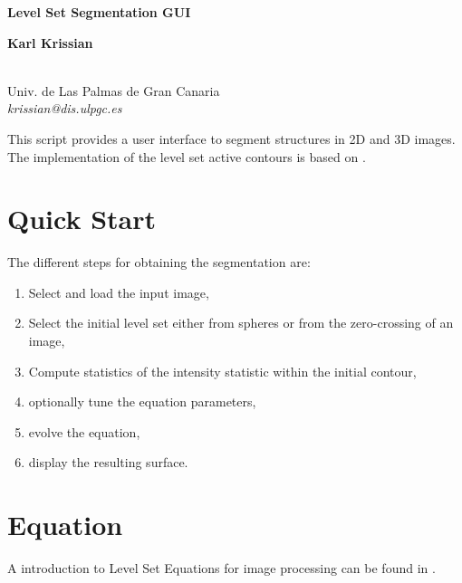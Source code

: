 \documentclass{article}
\begin{document}
\centerline{\Large \bf Level Set Segmentation GUI}
 \smallkip

 \centerline{\bf Karl Krissian}
  \smallskip
  \centerline{
  \\
  Univ. de Las Palmas de Gran Canaria\\
  {\it krissian@dis.ulpgc.es}
  }



    This script provides a user interface to segment structures in 2D and 3D images. 
    The implementation of the level set active contours is based on \cite{KrissianWestin05}.



\section{Quick Start}

The different steps for obtaining the segmentation are:
\begin{enumerate}
  \item Select and load the input image,
  \item Select the initial level set either from spheres or from the zero-crossing of an image,
  \item Compute statistics of the intensity statistic within the initial contour,
  \item optionally tune the equation parameters,
  \item evolve the equation,
  \item display the resulting surface.
\end{enumerate}


\section{Equation}
A introduction to Level Set Equations for image processing can be found in 
\cite{Sethian99book,Sapiro01,Osher2002,OsherParagios2003}.
\end{document}

